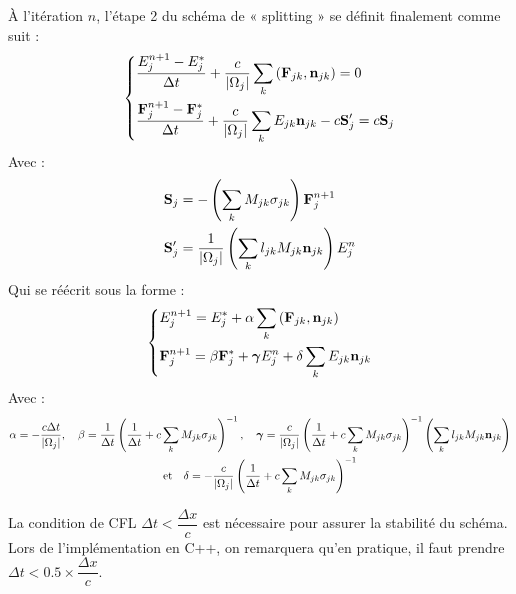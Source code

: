 À l'itération $n$, l'étape 2 du schéma de « splitting » se définit finalement comme suit \parencite[161]{Reference2} :
\begin{equation*} 
    \begin{dcases}
    \frac{E_j^{n+1} - E_j^*}{\Delta t} + \frac{c}{\left| \Omega_j \right|} \sum_k \left( \mathbf{F}_{jk}, \mathbf{n}_{jk} \right) = 0 \\
    \frac{\mathbf{F}_j^{n+1} - \mathbf{F}_j^*}{\Delta t} + \frac{c}{\left| \Omega_j \right|} \sum_k E_{jk} \mathbf{n}_{jk} -c \mathbf{S}_j^{\prime} = c \mathbf{S}_j 
    \end{dcases}   
\end{equation*}
Avec :
\begin{align*}
    \mathbf{S}_j &= - \left( \sum_k M_{jk} \sigma_{jk} \right) \mathbf{F}_{j}^{n+1} \\
    \mathbf{S}_j^{\prime} &= \frac{1}{\left| \Omega_j \right|} \left( \sum_k l_{jk} M_{jk} \mathbf{n}_{jk} \right) E_j^n \\
\end{align*}
Qui se réécrit sous la forme :
\begingroup
\Large
\begin{equation} 
    \begin{dcases}
    E_j^{n+1} = E_j^* + \alpha \sum_k \left( \mathbf{F}_{jk}, \mathbf{n}_{jk} \right) \\
    \mathbf{F}_j^{n+1} = \beta \mathbf{F}_j^* + \bm{\gamma} E_j^n + \delta \sum_k E_{jk} \mathbf{n}_{jk}
    \end{dcases}   
\label{eqn:Step2}
\end{equation}
\endgroup
Avec :
\begin{gather*} 
\alpha = -\frac{c \Delta t}{\left| \Omega_j \right|}, \quad 
\beta = \frac{1}{\Delta t} \left( \frac{1}{\Delta t} + c \sum_k M_{jk} \sigma_{jk} \right)^{-1}, \quad 
\bm{\gamma} = \frac{c}{\left| \Omega_j \right|} \left( \frac{1}{\Delta t} + c \sum_k M_{jk} \sigma_{jk} \right)^{-1} \left( \sum_k l_{jk} M_{jk} \mathbf{n}_{jk} \right) \\
\text{et} \quad \delta = -\frac{c}{\left| \Omega_j \right|} \left( \frac{1}{\Delta t} + c \sum_k M_{jk} \sigma_{jk} \right)^{-1}
\end{gather*}

La condition de CFL $\Delta t < \dfrac{\Delta x}{c}$ est nécessaire pour assurer la stabilité du schéma. Lors de l'implémentation en C++, on remarquera qu'en pratique, il faut prendre $\Delta t < 0.5 \times \dfrac{\Delta x}{c}.$ 

